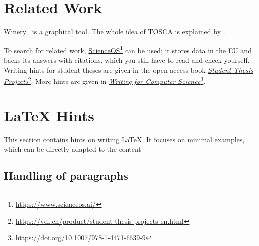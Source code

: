 \section{Related Work}
\label{sec:relatedwork}

Winery~\citep{Winery} is a graphical  tool.
The whole idea of TOSCA is explained by \citet{Binz2009}.

To search for related work, \href{https://www.scienceos.ai/}{ScienceOS}\footnote{\url{https://www.scienceos.ai/}} can be used; it stores data in the EU and backs its answers with citations, which you still have to read and check yourself.
Writing hints for student theses are given in the open-access book \href{https://vdf.ch/product/student-thesis-projects-en.html}{\emph{Student Thesis Projects}}\footnote{\url{https://vdf.ch/product/student-thesis-projects-en.html}}.
More hints are given in \href{https://doi.org/10.1007/978-1-4471-6639-9}{\emph{Writing for Computer Science}}\footnote{\url{https://doi.org/10.1007/978-1-4471-6639-9}}.

\section{LaTeX Hints}
\label{sec:latexhints}

\newcount\LTGbeginlineexample
\newcount\LTGendlineexample
\newenvironment{ltgexample}%
{\LTGbeginlineexample=\numexpr\inputlineno+1\relax}%
{\LTGendlineexample=\numexpr\inputlineno-1\relax%
  \tcbinputlisting{%
    listing only,
    breakable,
    listing file=\currfilepath,
    colback=green!5!white,
    colframe=green!25,
    coltitle=black!90,
    coltext=black!90,
    left=8mm,
    title=Corresponding \LaTeX{} code of \texttt{\currfilepath},
    minted language=TeX,
    minted style=vs,
    minted options={
        fontsize=\footnotesize,
        firstline=\the\LTGbeginlineexample,
        lastline=\the\LTGendlineexample,
        firstnumber=\the\LTGbeginlineexample,
        breaklines,
        linenos,
        numbersep=8pt
      }
  }
}%

This section contains hints on writing LaTeX.
It focuses on minimal examples, which can be directly adapted to the content

\subsection{Handling of paragraphs}

